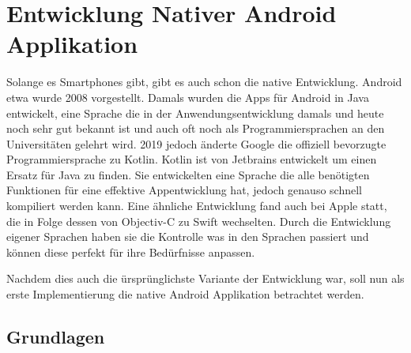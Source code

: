 \section{Entwicklung Nativer Android Applikation}
Solange es Smartphones gibt, gibt es auch schon die native Entwicklung. Android etwa wurde 2008 vorgestellt. Damals wurden die Apps für Android in Java entwickelt, eine Sprache die in der Anwendungsentwicklung damals und heute noch sehr gut bekannt ist und auch oft noch als Programmiersprachen an den Universitäten gelehrt wird. 2019 jedoch änderte Google die offiziell bevorzugte Programmiersprache zu Kotlin. Kotlin ist von Jetbrains entwickelt um einen Ersatz für Java zu finden. Sie entwickelten eine Sprache die alle benötigten Funktionen für eine effektive Appentwicklung hat, jedoch genauso schnell kompiliert werden kann. Eine ähnliche Entwicklung fand auch bei Apple statt, die in Folge dessen von Objectiv-C zu Swift wechselten. Durch die Entwicklung eigener Sprachen haben sie die Kontrolle was in den Sprachen passiert und können diese perfekt für ihre Bedürfnisse anpassen.

Nachdem dies auch die ürsprünglichste Variante der Entwicklung war, soll nun als erste Implementierung die native Android Applikation betrachtet werden.

\subsection{Grundlagen}
